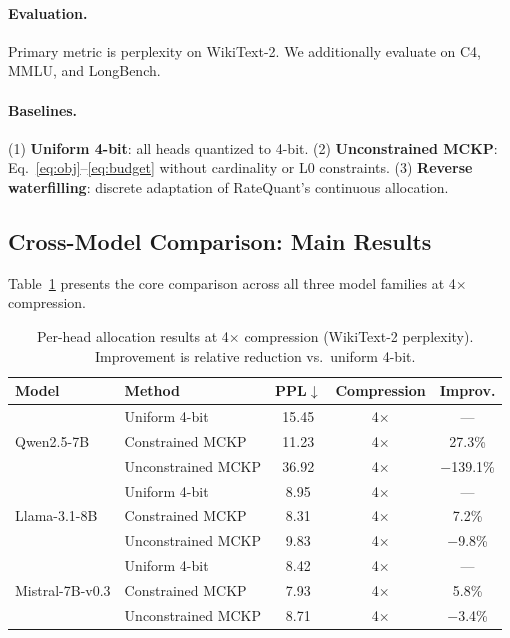 \documentclass[11pt]{article}
\begin{document}
\paragraph{Evaluation.} Primary metric is perplexity on WikiText-2. We additionally evaluate on C4, MMLU, and LongBench.

\paragraph{Baselines.} (1) \textbf{Uniform 4-bit}: all heads quantized to 4-bit. (2) \textbf{Unconstrained MCKP}: Eq.~\eqref{eq:obj}--\eqref{eq:budget} without cardinality or L0 constraints. (3) \textbf{Reverse waterfilling}: discrete adaptation of RateQuant's continuous allocation.

\subsection{Cross-Model Comparison: Main Results}
\label{sec:main-results}

Table~\ref{tab:main} presents the core comparison across all three model families at 4$\times$ compression.

\begin{table}[h]
\centering
\caption{Per-head allocation results at 4$\times$ compression (WikiText-2 perplexity). Improvement is relative reduction vs.\ uniform 4-bit.}
\label{tab:main}
\begin{tabular}{llccc}
\toprule
\textbf{Model} & \textbf{Method} & \textbf{PPL$\downarrow$} & \textbf{Compression} & \textbf{Improv.} \\
\midrule
\multirow{3}{*}{Qwen2.5-7B}
  & Uniform 4-bit          & 15.45 & 4$\times$ & --- \\
  & Constrained MCKP       & 11.23 & 4$\times$ & 27.3\% \\
  & Unconstrained MCKP     & 36.92 & 4$\times$ & $-$139.1\% \\
\midrule
\multirow{3}{*}{Llama-3.1-8B}
  & Uniform 4-bit          & 8.95  & 4$\times$ & --- \\
  & Constrained MCKP       & 8.31  & 4$\times$ & 7.2\% \\
  & Unconstrained MCKP     & 9.83  & 4$\times$ & $-$9.8\% \\
\midrule
\multirow{3}{*}{Mistral-7B-v0.3}
  & Uniform 4-bit          & 8.42  & 4$\times$ & --- \\
  & Constrained MCKP       & 7.93  & 4$\times$ & 5.8\% \\
  & Unconstrained MCKP     & 8.71  & 4$\times$ & $-$3.4\% \\
\bottomrule
\end{tabular}
\end{table}
\end{document}
